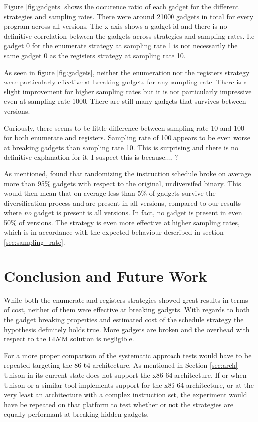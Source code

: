 Figure \ref{fig:gadgets} shows the occurence ratio of each gadget for the different
strategies and sampling rates. There were around 21000 gadgets in total for every program
across all versions. The x-axis shows a gadget id and there is no definitive correlation
between the gadgets across strategies and sampling rates. I.e gadget 0 for the enumerate
strategy at sampling rate 1 is not necessarily the same gadget 0 as the registers strategy
at sampling rate 10.

As seen in figure \ref{fig:gadgets}, neither the enumeration nor the registers strategy
were particularly effective at breaking gadgets for any sampling rate. There is a slight
improvement for higher sampling rates but it is not particularly impressive even at
sampling rate 1000. There are still many gadgets that survives between versions.

Curiously, there seems to be little difference between sampling rate 10 and 100 for both
enumerate and registers. Sampling rate of 100 appears to be even worse at breaking gadgets
than sampling rate 10. This is surprising and there is no definitive explanation for it.
I suspect this is because.... ?

As mentioned, \textcite{large-scale-automated} found that randomizing the instruction
schedule broke on average more than 95\% gadgets with respect to the original, undiversifed
binary. This would then mean that on average less than 5\% of gadgets survive the
diversification process and are present in all versions, compared to our results where
\textit{no} gadget is present is all versions. In fact, no gadget is present in even
50\% of versions. The strategy is even more effective at higher sampling rates, which is
in accordance with the expected behaviour described in section \ref{sec:sampling_rate}.

\section{Conclusion and Future Work}

While both the enumerate and registers strategies showed great results in terms of cost,
neither of them were effective at breaking gadgets. With regards to both the gadget
breaking properties and estimated cost of the schedule strategy the hypothesis definitely
holds true. More gadgets are broken and the overhead with respect to the LLVM solution
is negligible.

For a more proper comparison of the systematic approach tests would have to be repeated
targeting the 86-64 architecture. As mentioned in Section \ref{sec:arch} Unison in its
current state does not support the x86-64 architecture. If or when Unison or a similar
tool implements support for the x86-64 architecture, or at the very least an architecture
with a complex instruction set, the experiment would have be repeated on that platform to
test whether or not the strategies are equally performant at breaking hidden gadgets.

